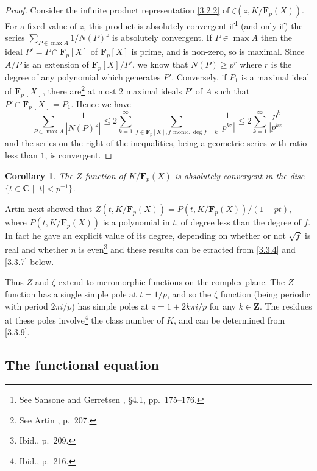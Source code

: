 \documentclass[10pt,leqno]{article}
\newtheorem{coro}[theo]{Corollary}
\theoremstyle{definition}
\def\ZZ{\mathbf{Z}}
\def\CC{\mathbf{C}}
\def\FF{\mathbf{F}}
\def\fntwfi{See Sansone and Gerretsen \cite{bib:162}, \S4.1, pp.~175--176.}
\def\fntwsi{See Artin \cite{bib:6}, p.~207.}
\def\fntwse{Ibid., p.~209.}
\def\fntwei{Ibid., p.~216.}
\begin{document}
\begin{proof}
Consider the infinite product representation \eqref{3.2.2} of $\zeta(z, K/\FF_p(X))$.
For a fixed value of $z$, this product is absolutely convergent if\footnote{\fntwfi} (and only if) the series $\sum_{P \in \max A} 1/N(P)^z$ is absolutely convergent.
If $P \in \max A$ then the ideal $P' = P \cap \FF_p[X]$ of $\FF_p[X]$ is prime, and is non-zero, so is maximal.
Since $A/P$ is an extension of $\FF_p[X] / P'$, we know that $N(P) \geq p^r$ where $r$ is the degree of any polynomial which generates $P'$.
Conversely, if $P_1$ is a maximal ideal of $\FF_p[X]$, there are\footnote{\fntwsi} at most $2$ maximal ideals $P'$ of $A$ such that $P' \cap \FF_p[X] = P_1$.
Hence we have
\[
\sum_{P \in \max A} \frac{1}{|N(P)^z|}
\leq 2 \sum_{k=1}^\infty \sum_{f \in \FF_p[X], \text{$f$ monic}, \deg f = k} \frac{1}{|p^{kz}|}
\leq 2 \sum_{k=1}^\infty \frac{p^k}{|p^{kz}|}
\]
and the series on the right of the inequalities, being a geometric series with ratio less than $1$, is convergent.
\end{proof}


\begin{coro}
\label{3.2.5}
The $Z$ function of $K / \FF_p(X)$ is absolutely convergent in the disc $\{ t \in \CC \mid |t| < p^{-1} \}$.
\end{coro}

Artin next showed that $Z(t, K/\FF_p(X)) = P(t, K/\FF_p(X)) / (1 - pt)$, where $P(t, K/\FF_p(X))$ is a polynomial in $t$, of degree less than the degree of $f$.
In fact he gave an explicit value of its degree, depending on whether or not $\sqrt f$ is real and whether $n$ is even\footnote{\fntwse} and these results can be etracted from \eqref{3.3.4} and \eqref{3.3.7} below.

Thus $Z$ and $\zeta$ extend to meromorphic functions on the complex plane.
The $Z$ function has a single simple pole at $t = 1/p$, and so the $\zeta$ function (being periodic with period $2\pi i / p$) has simple poles at $z = 1 + 2k \pi i / p$ for any $k \in \ZZ$.
The residues at these poles involve\footnote{\fntwei} the class number of $K$, and can be determined from \eqref{3.3.9}.


\subsection{The functional equation}
\label{ch:3.3}
\end{document}
